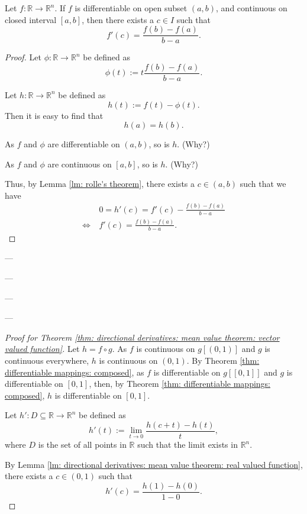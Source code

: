 \begin{lemma}
	\label{lm: directional derivatives: mean value theorem: real valued function}
	
	Let $f: \mathbb R \to \mathbb R^n$. If $f$ is differentiable on open subset $(a,b)$, and continuous on closed interval $[a,b]$, then there exists a $c \in I$ such that
	$$
	f'(c) = \frac{f(b) - f(a)}{b - a}.
	$$
	
	\begin{proof}
		Let $\phi: \mathbb R \to \mathbb R^n$ be defined as
		$$
		\phi(t) := t \frac{f(b)-f(a)}{b-a}.
		$$
	
		Let $h: \mathbb R \to \mathbb R^n$ be defined as
		$$
		h(t) := f(t) - \phi(t).
		$$
		Then it is easy to find that
		$$
		h(a) = h(b).
		$$
		
		As $f$ and $\phi$ are differentiable on $(a,b)$, so is $h$. (Why?)
		
		As $f$ and $\phi$ are continuous on $[a,b]$, so is $h$. (Why?)
		
		Thus, by Lemma \ref{lm: rolle's theorem}, there exists a $c \in (a,b)$ such that we have
		$$
		\begin{aligned}
			& \ 0 = h'(c) = f'(c) - \frac{f(b) - f(a)}{b - a} \\
			\iff & \ f'(c) = \frac{f(b) - f(a)}{b - a}.
		\end{aligned}
		$$
		
	\end{proof}
\end{lemma}


---

---

---

---


\begin{proof}[Proof for Theorem \ref{thm: directional derivatives: mean value theorem: vector valued function}]
	Let $h = f \circ g$. As $f$ is continuous on $g[(0,1)]$ and $g$ is continuous everywhere, $h$ is continuous on $(0,1)$. By Theorem \ref{thm: differentiable mappings: composed}, as $f$ is differentiable on $g[[0,1]]$ and $g$ is differentiable on $[0,1]$, then, by Theorem \ref{thm: differentiable mappings: composed}, $h$ is differentiable on $[0,1]$.
	
	Let $h': D \subseteq \mathbb R \to \mathbb R^n$ be defined as
	$$
	h'(t) := \lim_{t \to 0} \frac{h(c + t) - h(t)}{t},
	$$
	where $D$ is the set of all points in $\mathbb R$ such that the limit exists in $\mathbb R^n$.
	
	By Lemma \ref{lm: directional derivatives: mean value theorem: real valued function}, there exists a $c \in (0,1)$ such that
	$$
	h'(c) = \frac{h(1) - h(0)}{1 - 0}.
	$$
	
	
\end{proof}



